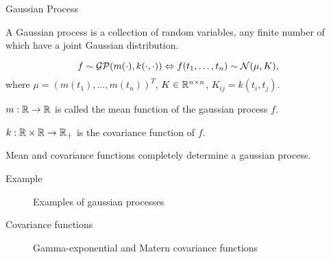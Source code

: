 \begin{frame}{Gaussian Process}
			\begin{definition}
				A Gaussian process is a collection of random variables, any finite number of which have a joint Gaussian distribution.
			\end{definition}

			$$f \sim \mathcal{GP}(m(\cdot), k(\cdot, \cdot)) \Leftrightarrow f(t_1, \ldots, t_n) \sim \mathcal{N}(\mu, K),$$
			where $\mu = (m(t_1), \ldots, m(t_n))^T$, $K \in \mathbb{R}^{n \times n}$, $K_{ij} = k(t_i, t_j)$.

			$m: \mathbb{R} \rightarrow \mathbb{R}$ is called the mean function of the gaussian process $f$.

			$k: \mathbb{R} \times \mathbb{R} \rightarrow \mathbb{R}_+$ is the covariance function of $f$.

			\vspace{0.5cm}
			Mean and covariance functions completely determine a gaussian process.

		\end{frame}

		\begin{frame}{Example}
			\begin{figure}[!h]
				\centering
				\subfloat{
					\scalebox{0.5}{
						
					}
				}
				\subfloat{
					\scalebox{0.5}{
						
					}
				}
				\caption{Examples of gaussian processes}
			\end{figure}
		\end{frame}

		\begin{frame}{Covariance functions}
			\begin{figure}[!h]
				\centering
				\subfloat{
					\scalebox{0.3}{
						
					}
				}
				\subfloat{
					\scalebox{0.3}{
						
					}
				}
				\subfloat{
					\scalebox{0.3}{
						
					}
				}

				\subfloat{
					\scalebox{0.3}{
						
					}
				}
				\subfloat{
					\scalebox{0.3}{
						
					}
				}
				\subfloat{
					\scalebox{0.3}{
						
					}
				}
				\caption{Gamma-exponential and Matern covariance functions}
			\end{figure}
		\end{frame}